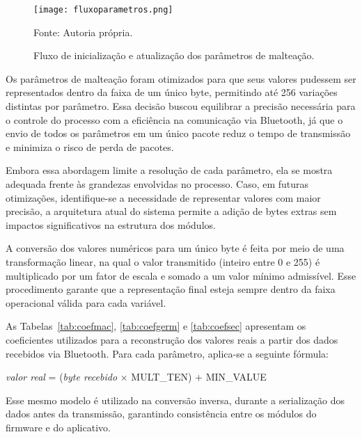 \begin{figure}[ht]
    \centering
    \caption{Fluxo de inicialização e atualização dos parâmetros de malteação.}
    \label{fig:fluxoparametros}
    \texttt{[image: fluxoparametros.png]}

    {\centering\footnotesize Fonte: Autoria própria.\par}
\end{figure}

Os parâmetros de malteação foram otimizados para que seus valores pudessem ser representados dentro da faixa de um único byte, permitindo até 256 variações distintas por parâmetro. Essa decisão buscou equilibrar a precisão necessária para o controle do processo com a eficiência na comunicação via Bluetooth, já que o envio de todos os parâmetros em um único pacote reduz o tempo de transmissão e minimiza o risco de perda de pacotes.

Embora essa abordagem limite a resolução de cada parâmetro, ela se mostra adequada frente às grandezas envolvidas no processo. Caso, em futuras otimizações, identifique-se a necessidade de representar valores com maior precisão, a arquitetura atual do sistema permite a adição de bytes extras sem impactos significativos na estrutura dos módulos.

A conversão dos valores numéricos para um único byte é feita por meio de uma transformação linear, na qual o valor transmitido (inteiro entre 0 e 255) é multiplicado por um fator de escala e somado a um valor mínimo admissível. Esse procedimento garante que a representação final esteja sempre dentro da faixa operacional válida para cada variável.

As Tabelas~\ref{tab:coefmac}, \ref{tab:coefgerm} e \ref{tab:coefsec} apresentam os coeficientes utilizados para a reconstrução dos valores reais a partir dos dados recebidos via Bluetooth. Para cada parâmetro, aplica-se a seguinte fórmula:

\begin{center}
    \textit{valor real} = (\textit{byte recebido} × MULT\_TEN) + MIN\_VALUE
\end{center}

Esse mesmo modelo é utilizado na conversão inversa, durante a serialização dos dados antes da transmissão, garantindo consistência entre os módulos do firmware e do aplicativo.

